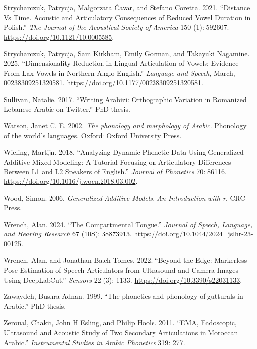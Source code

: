 \documentclass[
]{interact}
\newlength{\cslhangindent}
\newenvironment{CSLReferences}[2] %
 {\begin{list}{}{%
  \setlength{\itemindent}{0pt}
  \setlength{\leftmargin}{0pt}
  \setlength{\parsep}{0pt}
  \ifodd #1
   \setlength{\leftmargin}{\cslhangindent}
   \setlength{\itemindent}{-1\cslhangindent}
  \fi
  \setlength{\itemsep}{#2\baselineskip}}}
 {\end{list}}
\begin{document}
\begin{CSLReferences}{1}{0}
Strycharczuk, Patrycja, Małgorzata Ćavar, and Stefano Coretta. 2021.
{``Distance Vs Time. Acoustic and Articulatory Consequences of Reduced
Vowel Duration in Polish.''} \emph{The Journal of the Acoustical Society
of America} 150 (1): 592607. \url{https://doi.org/10.1121/10.0005585}.

Strycharczuk, Patrycja, Sam Kirkham, Emily Gorman, and Takayuki
Nagamine. 2025. {``Dimensionality Reduction in Lingual Articulation of
Vowels: Evidence From Lax Vowels in Northern Anglo-English.''}
\emph{Language and Speech}, March, 00238309251320581.
\url{https://doi.org/10.1177/00238309251320581}.

Sullivan, Natalie. 2017. {``Writing Arabizi: Orthographic Variation in
Romanized Lebanese Arabic on Twitter.''} PhD thesis.

Watson, Janet C. E. 2002. \emph{The phonology and morphology of Arabic}.
Phonology of the world's languages. Oxford: Oxford University Press.

Wieling, Martijn. 2018. {``Analyzing Dynamic Phonetic Data Using
Generalized Additive Mixed Modeling: A Tutorial Focusing on Articulatory
Differences Between L1 and L2 Speakers of English.''} \emph{Journal of
Phonetics} 70: 86116. \url{https://doi.org/10.1016/j.wocn.2018.03.002}.

Wood, Simon. 2006. \emph{Generalized Additive Models: An Introduction
with r}. CRC Press.

Wrench, Alan. 2024. {``The Compartmental Tongue.''} \emph{Journal of
Speech, Language, and Hearing Research} 67 (10S): 38873913.
\url{https://doi.org/10.1044/2024_jslhr-23-00125}.

Wrench, Alan, and Jonathan Balch-Tomes. 2022. {``Beyond the Edge:
Markerless Pose Estimation of Speech Articulators from Ultrasound and
Camera Images Using DeepLabCut.''} \emph{Sensors} 22 (3): 1133.
\url{https://doi.org/10.3390/s22031133}.

Zawaydeh, Bushra Adnan. 1999. {``The phonetics and phonology of
gutturals in Arabic.''} PhD thesis.

Zeroual, Chakir, John H Esling, and Philip Hoole. 2011. {``EMA,
Endoscopic, Ultrasound and Acoustic Study of Two Secondary Articulations
in Moroccan Arabic.''} \emph{Instrumental Studies in Arabic Phonetics}
319: 277.

\end{CSLReferences}
\end{document}
